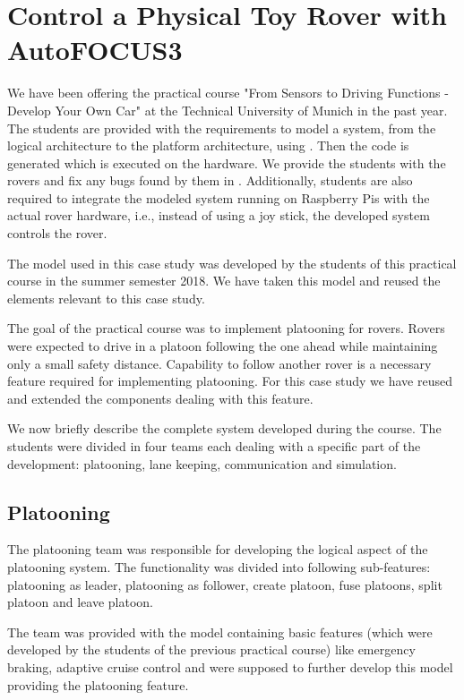 \section{Control a Physical Toy Rover with AutoFOCUS3}

We have been offering the practical course "From Sensors to Driving Functions - Develop Your Own Car" at the Technical University of Munich in the past year. The students are provided with the requirements to model a system, from the logical architecture to the platform architecture, using \af. Then the code is generated which is executed on the hardware.  We provide the students with the rovers and fix any bugs found by them in \af. Additionally, students are also required to integrate the modeled system running on Raspberry Pis with the actual rover hardware, i.e., instead of using a joy stick, the developed system controls the rover.

The model used in this case study was developed by the students of this practical course in the summer semester 2018. We have taken this model and reused the elements relevant to this case study. 

The goal of the practical course was to implement platooning for rovers. Rovers were expected to drive in a platoon following the one ahead while maintaining only a small safety distance. Capability to follow another rover is a necessary feature required for implementing platooning. For this case study we have reused and extended the components dealing with this feature. 

We now briefly describe the complete system developed during the course. The students were divided in four teams each dealing with a specific part of the development: platooning, lane keeping, communication and simulation.

\subsection{Platooning}
The platooning team was responsible for developing the logical aspect of the platooning system. The functionality was divided into following sub-features: platooning as leader, platooning as follower, create platoon, fuse platoons, split platoon and leave platoon.

The team was provided with the model containing basic features (which were developed by the students of the previous practical course) like emergency braking, adaptive cruise control and were supposed to further develop this model providing the platooning feature.

